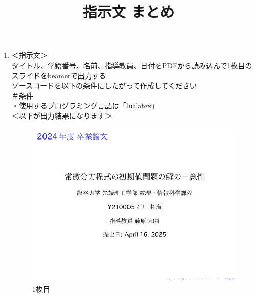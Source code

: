 \documentclass[a4paper]{article}
\begin{document}
    \title{指示文 まとめ}
    \maketitle

        \begin{enumerate}
            \item ＜指示文＞\\
            タイトル、学籍番号、名前、指導教員、日付をPDFから読み込んで1枚目のスライドをbeamerで出力する\\
            ソースコードを以下の条件にしたがって作成してください\\
            ＃条件\\
            ・使用するプログラミング言語は「lualatex」\\

            ＜以下が出力結果になります＞\\
            \begin{figure}[h]
                \centering
                \includegraphics[scale=0.7]{sijibun.pdf}
                \caption{1枚目}
            \end{figure}

            \newpage


\end{enumerate}
\end{document}
